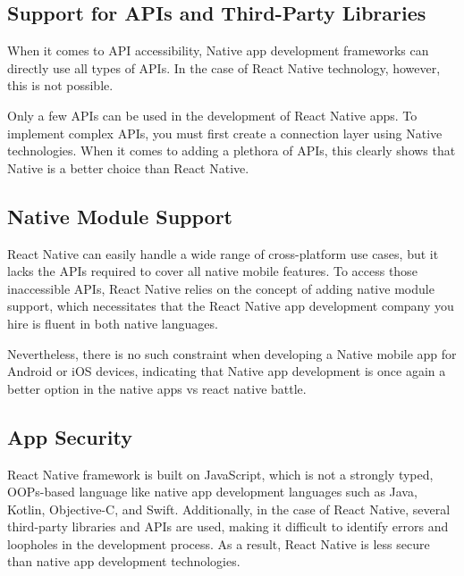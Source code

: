 \subsection{Support for APIs and Third-Party Libraries}

When it comes to API accessibility, Native app development frameworks can directly use all types of APIs. In the
case of React Native technology, however, this is not possible.

Only a few APIs can be used in the development of React Native apps.
To implement complex APIs, you must first create a connection layer using Native technologies.
When it comes to adding a plethora of APIs, this clearly shows that Native is a better choice than React Native.

\subsection{Native Module Support}

React Native can easily handle a wide range of cross-platform use cases, but it lacks the APIs required to cover all
native mobile features.
To access those inaccessible APIs, React Native relies on the concept of adding native module support, which
necessitates that the React Native app development company you hire is fluent in both native languages.

Nevertheless, there is no such constraint when developing a Native mobile app for Android or iOS devices, indicating
that Native app development is once again a better option in the native apps vs react native battle.

\subsection{App Security}

React Native framework is built on JavaScript, which is not a strongly typed, OOPs-based language like native
app development languages such as Java, Kotlin, Objective-C, and Swift.
Additionally, in the case of React Native, several third-party libraries and APIs are used, making it difficult to
identify errors and loopholes in the development process.
As a result, React Native is less secure than native app development technologies.
